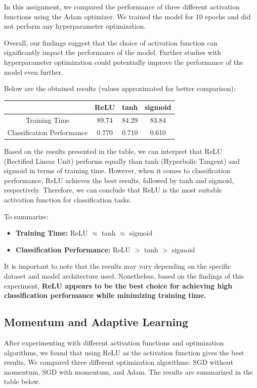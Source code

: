 \documentclass[a4paper]{article}
\begin{document}
In this assignment, we compared the performance of three different activation functions using the Adam optimizer. We trained the model for 10 epochs and did not perform any hyperparameter optimization.  

Overall, our findings suggest that the choice of activation function can significantly impact the performance of the model. Further studies with hyperparameter optimization could potentially improve the performance of the model even further.

Below are the obtained results (values approximated for better comparison):

\begin{table}[H]
\centering
\begin{tabular}{||c | c | c | c ||} 
 \hline
   & ReLU & tanh & sigmoid \\ [0.5ex] 
 \hline\hline
 Training Time & 89.74 & 84.29 & 83.84 \\ 
 Classification Performance & 0.770 & 0.710 & 0.610\\[1ex] 
 \hline
\end{tabular}
\label{table:1}
\end{table}

Based on the results presented in the table, we can interpret that ReLU (Rectified Linear Unit) performs equally  than tanh (Hyperbolic Tangent) and sigmoid in terms of training time. However, when it comes to classification performance, ReLU achieves the best results, followed by tanh and sigmoid, respectively. Therefore, we can conclude that ReLU is the most suitable activation function for classification tasks.

To summarize:

\begin{itemize}
\item \textbf{Training Time:} ReLU $\approx$ tanh $\approx$ sigmoid
\item \textbf{Classification Performance:} ReLU $>$ tanh $>$ sigmoid
\end{itemize}

It is important to note that the results may vary depending on the specific dataset and model architecture used. Nonetheless, based on the findings of this experiment, \textbf{ReLU appears to be the best choice for achieving high classification performance while minimizing training time.}

\subsection{Momentum and Adaptive Learning}
After experimenting with different activation functions and optimization algorithms, we found that using ReLU as the activation function gives the best results. We compared three different optimization algorithms: SGD without momentum, SGD with momentum, and Adam. The results are summarized in the table below.
\end{document}
